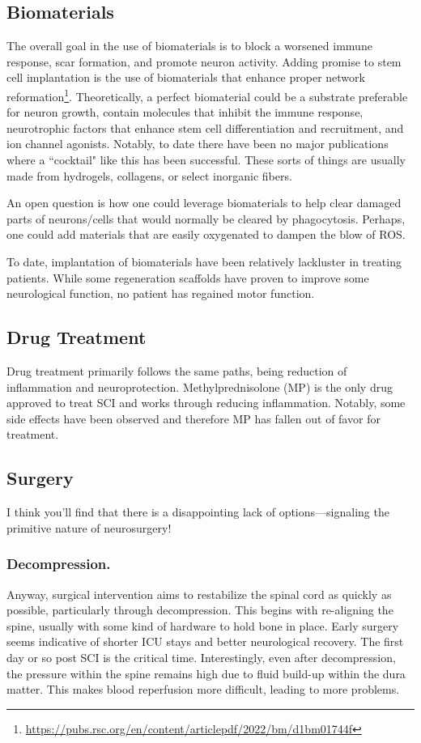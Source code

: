 \documentclass[12pt]{report}
\begin{document}
\subsection{Biomaterials}
The overall goal in the use of biomaterials is to block a worsened immune response, scar formation, and promote neuron activity. Adding promise to stem cell implantation is the use of biomaterials that enhance proper network reformation\footnote{\url{https://pubs.rsc.org/en/content/articlepdf/2022/bm/d1bm01744f}}. Theoretically, a perfect biomaterial could be a substrate preferable for neuron growth, contain molecules that inhibit the immune response, neurotrophic factors that enhance stem cell differentiation and recruitment, and ion channel agonists. Notably, to date there have been no major publications where a ``cocktail" like this has been successful. These sorts of things are usually made from hydrogels, collagens, or select inorganic fibers.\newline

An open question is how one could leverage biomaterials to help clear damaged parts of neurons/cells that would normally be cleared by phagocytosis. Perhaps, one could add materials that are easily oxygenated to dampen the blow of ROS.\newline

To date, implantation of biomaterials have been relatively lackluster in treating patients. While some regeneration scaffolds have proven to improve some neurological function, no patient has regained motor function. 

\subsection{Drug Treatment}
Drug treatment primarily follows the same paths, being reduction of inflammation and neuroprotection. Methylprednisolone (MP) is the only drug approved to treat SCI and works through reducing inflammation. Notably, some side effects have been observed and therefore MP has fallen out of favor for treatment. 

\subsection{Surgery}
I think you'll find that there is a disappointing lack of options---signaling the primitive nature of neurosurgery!

\subsubsection{Decompression.}
 Anyway, surgical intervention aims to restabilize the spinal cord as quickly as possible, particularly through decompression. This begins with re-aligning the spine, usually with some kind of hardware to hold bone in place. Early surgery seems indicative of shorter ICU stays and better neurological recovery. The first day or so post SCI is the critical time. Interestingly, even after decompression, the pressure within the spine remains high due to fluid build-up within the dura matter. This makes blood reperfusion more difficult, leading to more problems. 
 
\end{document}
